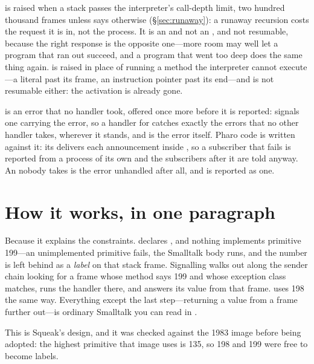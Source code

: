  is raised when a stack passes the interpreter's
call-depth limit, two hundred thousand frames unless 
says otherwise (\S\ref{sec:runaway}): a runaway recursion costs the request
it is in, not the process. It is an  and not an ,
and not resumable, because the right response is the opposite one---more
room may well let a program that ran out succeed, and a program that went
too deep does the same thing again.  is raised in place of
running a method the interpreter cannot execute---a literal past its frame,
an instruction pointer past its end---and is not resumable either: the
activation is already gone.

 is an error that no handler took, offered once more
before it is reported:  signals one carrying the
error, so a handler for  catches exactly the errors that
no other handler takes, wherever it stands, and  is the error
itself. Pharo code is written against it: its  delivers each
announcement inside , so a
subscriber that fails is reported from a process of its own and the
subscribers after it are told anyway. An  nobody takes is
the error unhandled after all, and is reported as one.

\section{How it works, in one paragraph}

Because it explains the constraints.  declares
, and nothing implements primitive 199---an unimplemented
primitive fails, the Smalltalk body runs, and the number is left behind as a
\emph{label} on that stack frame. Signalling walks out along the sender chain
looking for a frame whose method says 199 and whose exception class matches,
runs the handler there, and answers its value from that frame. 
uses 198 the same way. Everything except the last step---returning a value
from a frame further out---is ordinary Smalltalk you can read in
.

\begin{stnote}
This is Squeak's design, and it was checked against the 1983 image before
being adopted: the highest primitive that image uses is 135, so 198 and 199
were free to become labels.
\end{stnote}
